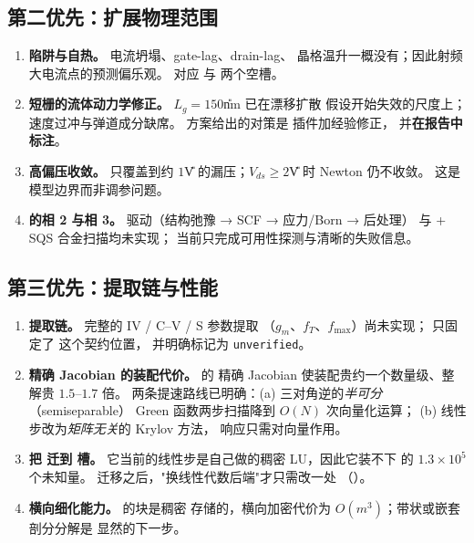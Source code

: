 \subsection*{第二优先：扩展物理范围}

\begin{enumerate}[leftmargin=1.9em,itemsep=0.4em,topsep=0.4em,start=4]
  \item \textbf{陷阱与自热。} 电流坍塌、gate-lag、drain-lag、
        晶格温升一概没有；因此射频大电流点的预测偏乐观。
        对应  与  两个空槽。
  \item \textbf{短栅的流体动力学修正。} $L_g=150$\U{nm} 已在漂移扩散
        假设开始失效的尺度上；速度过冲与弹道成分缺席。
        方案给出的对策是  插件加经验修正，
        并\textbf{在报告中标注}。
  \item \textbf{高偏压收敛。}  只覆盖到约
        $1$\U{V} 的漏压；$V_{ds}\ge2$\U{V} 时 Newton 仍不收敛。
        这是模型边界而非调参问题。
  \item \textbf{ 的相 2 与相 3。}
         驱动（结构弛豫 → SCF → 应力/Born → 后处理）
        与  + SQS 合金扫描均未实现；
        当前只完成可用性探测与清晰的失败信息。
\end{enumerate}

\subsection*{第三优先：提取链与性能}

\begin{enumerate}[leftmargin=1.9em,itemsep=0.4em,topsep=0.4em,start=8]
  \item \textbf{提取链。} 完整的 IV / C--V / S 参数提取
        （$g_m$、$f_T$、$f_{\max}$）尚未实现；
         只固定了  这个契约位置，
        并明确标记为 \texttt{unverified}。
  \item \textbf{精确 Jacobian 的装配代价。}  的
        精确 Jacobian 使装配贵约一个数量级、整解贵 $1.5$--$1.7$ 倍。
        两条提速路线已明确：(a) 三对角逆的\emph{半可分}（semiseparable）
        Green 函数两步扫描降到 $O(N)$ 次向量化运算；
        (b) 线性步改为\emph{矩阵无关}的 Krylov 方法，
        响应只需对向量作用。
  \item \textbf{把  迁到  槽。}
        它当前的线性步是自己做的稠密 LU，因此它装不下
         的 $1.3\times10^{5}$ 个未知量。
        迁移之后，"换线性代数后端"才只需改一处
        （）。
  \item \textbf{横向细化能力。}  的块是稠密
        存储的，横向加密代价为 $O(m^3)$；带状或嵌套剖分分解是
        显然的下一步。
\end{enumerate}

